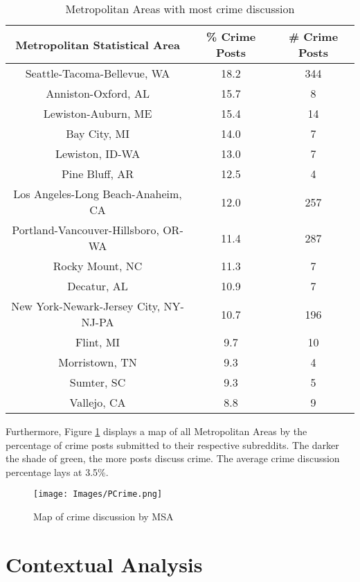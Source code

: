 \documentclass[12pt,oneside, letterpaper]{book}
\begin{document}
\begin{table}[h!]
    \centering
    \small
    \caption{Metropolitan Areas with most crime discussion}
    \begin{tabular}{| c | c | c |}
    \hline
    Metropolitan Statistical Area & \% Crime Posts & \# Crime Posts \\ \hline
    Seattle-Tacoma-Bellevue, WA & 18.2 & 344 \\ \hline
    Anniston-Oxford, AL & 15.7 & 8 \\ \hline
    Lewiston-Auburn, ME & 15.4 & 14 \\ \hline
    Bay City, MI & 14.0 & 7 \\ \hline
    Lewiston, ID-WA & 13.0 & 7 \\ \hline
    Pine Bluff, AR & 12.5 & 4 \\ \hline
    Los Angeles-Long Beach-Anaheim, CA & 12.0 & 257 \\ \hline
    Portland-Vancouver-Hillsboro, OR-WA & 11.4 & 287 \\ \hline
    Rocky Mount, NC & 11.3 & 7 \\ \hline
    Decatur, AL & 10.9 & 7 \\ \hline
    New York-Newark-Jersey City, NY-NJ-PA & 10.7 & 196 \\ \hline
    Flint, MI & 9.7 & 10 \\ \hline
    Morristown, TN & 9.3 & 4 \\ \hline
    Sumter, SC & 9.3 & 5 \\ \hline
    Vallejo, CA & 8.8 & 9 \\ \hline
	\end{tabular}
	\label{table:table-3}
\end{table}

\par Furthermore, Figure \ref{fig:map-1} displays a map of all Metropolitan Areas by the percentage of crime posts submitted to their respective subreddits. The darker the shade of green, the more posts discuss crime. The average crime discussion percentage lays at 3.5\%.

\begin{figure}[ht]
    \texttt{[image: Images/PCrime.png]}
    \caption{Map of crime discussion by MSA}
    \label{fig:map-1}
\end{figure}

\section{Contextual Analysis}
\end{document}
